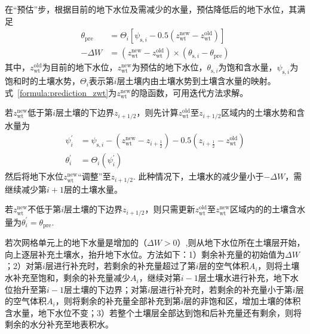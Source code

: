 在“预估”步，根据目前的地下水位及需减少的水量，预估降低后的地下水位，其满足
\begin{equation} \label{formula:prediction_zwt}
\begin{aligned}
\theta_{\mathrm{pre}} & = \Theta_i\left[\psi_{\mathrm{s},i} - 0.5\left(z_{\mathrm{wt}}^{\mathrm{new}} - z_{\mathrm{wt}}^{\mathrm{old}}\right)\right] \\
    - \Delta W & = \left(z_{\mathrm{wt}}^{\mathrm{new}} - z_{\mathrm{wt}}^{\mathrm{old}}\right) \times  \left(\theta_{\mathrm{s},i} - \theta_{\mathrm{pre}}\right)
\end{aligned}
\end{equation}
其中，$z_{\mathrm{wt}}^{\mathrm{old}}$为目前的地下水位，$z_{\mathrm{wt}}^{\mathrm{new}}$为预估的地下水位，$\theta_{\mathrm{s},i}$为饱和含水量，$\psi_{\mathrm{s},i}$为饱和时的土壤水势，$\Theta_i$表示第$i$层土壤内由土壤水势到土壤含水量的映射。式~\eqref{formula:prediction_zwt}为$z_{\mathrm{wt}}^{\mathrm{new}}$的隐函数，可用迭代方法求解。

若$z_{\mathrm{wt}}^{\mathrm{new}}$低于第$i$层土壤的下边界$z_{i+1/2}$，则先计算$z_{\mathrm{wt}}^{\mathrm{old}}$至$z_{i+1/2}$区域内的土壤水势和含水量为
\begin{equation} \label{formula:adjust_zwt1}
\begin{aligned}
\psi_i^{\prime} & = \psi_{\mathrm{s},i} - \left(z_{\mathrm{wt}}^{\mathrm{new}} - z_{i+\frac{1}{2}}\right) -0.5\left( z_{i+\frac{1}{2}} - z_{\mathrm{wt}}^{\mathrm{old}}\right) \\
\theta_i^{\prime} & = \Theta_i\left(\psi_i^{\prime}\right) 
\end{aligned}
\end{equation}
然后将地下水位$z_{\mathrm{wt}}^{\mathrm{new}}$“调整”至$z_{i+1/2}$. 此种情况下，土壤水的减少量小于$- \Delta W$，需继续减少第$i+1$层的土壤水量。

若$z_{\mathrm{wt}}^{\mathrm{new}}$不低于第$i$层土壤的下边界$z_{i+1/2}$，则只需更新$z_{\mathrm{wt}}^{\mathrm{old}}$至$z_{\mathrm{wt}}^{\mathrm{new}}$区域内的的土壤含水量为$\theta_i^{\prime} = \theta_{\mathrm{pre}}$.


若次网格单元上的地下水量是增加的（$\Delta W > 0$）,则从地下水位所在土壤层开始，向上逐层补充土壤水，抬升地下水位。方法如下：1）剩余补充量的初始值为$\Delta W$；2）对第$i$层进行补充时，若剩余的补充量超过了第$i$层的空气体积$A_i$，则将土壤水补充至饱和，剩余的补充量减少$A_i$，继续对第$i-1$层土壤水进行补充，地下水位抬升至第$i-1$层土壤的下边界；对第$i$层进行补充时，若剩余的补充量小于第$i$层的空气体积$A_i$，则将剩余的补充量全部补充到第$i$层的非饱和区，增加土壤的体积含水量，地下水位不变；3）若整个土壤层全部达到饱和后补充量还有剩余，则将剩余的水分补充至地表积水。



